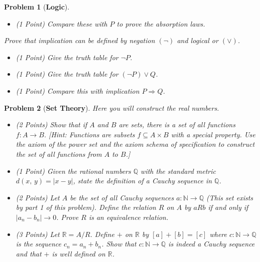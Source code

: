 \documentclass{article}
\theoremstyle{normal}
\newtheorem{problem}{Problem}
\begin{document}
\begin{problem}[\textbf{Logic}]
\begin{itemize}
            \item (1 Point) Compare these with $P$ to prove the absorption laws.
        \end{itemize}
        Prove that implication can be defined by
        \textit{negation} $(\neg)$ and \textit{logical or} $(\lor)$.
        \begin{itemize}
            \item (1 Point) Give the truth table for $\neg{P}$.
            \item (1 Point) Give the truth table for $(\neg{P})\lor{Q}$.
            \item (1 Point) Compare this with implication $P\Rightarrow{Q}$.
        \end{itemize}
    \end{problem}
    \clearpage
    \begin{problem}[\textbf{Set Theory}]
        \par\hfill\par\vspace{1em}
        Here you will construct the real numbers.
        \begin{itemize}
            \item (2 Points) Show that if $A$ and $B$ are sets, there is a set
                of all functions $f:A\rightarrow{B}$. [Hint: Functions are
                subsets $f\subseteq{A}\times{B}$ with a special property.
                Use the axiom of the power set and the axiom schema of
                specification to construct the set of all functions
                from $A$ to $B$.]
            \item (1 Point) Given the rational numbers $\mathbb{Q}$ with the
                standard metric $d(x,\,y)=|x-y|$, state the definition of a
                Cauchy sequence in $\mathbb{Q}$.
            \item (2 Points) Let $A$ be the set of all Cauchy sequences
                $a:\mathbb{N}\rightarrow\mathbb{Q}$ (This set exists by part 1
                of this problem). Define the relation $R$
                on $A$ by $aRb$ if and only if $|a_{n}-b_{n}|\rightarrow{0}$.
                Prove $R$ is an equivalence relation.
            \item (3 Points) Let $\mathbb{R}=A/R$. Define $+$ on $\mathbb{R}$
                by $[a]+[b]=[c]$ where $c:\mathbb{N}\rightarrow\mathbb{Q}$ is
                the sequence $c_{n}=a_{n}+b_{n}$. Show that
                $c:\mathbb{N}\rightarrow\mathbb{Q}$ is indeed a Cauchy sequence
                and that $+$ is well defined on $\mathbb{R}$.
        \end{itemize}
    \end{problem}
\end{document}
